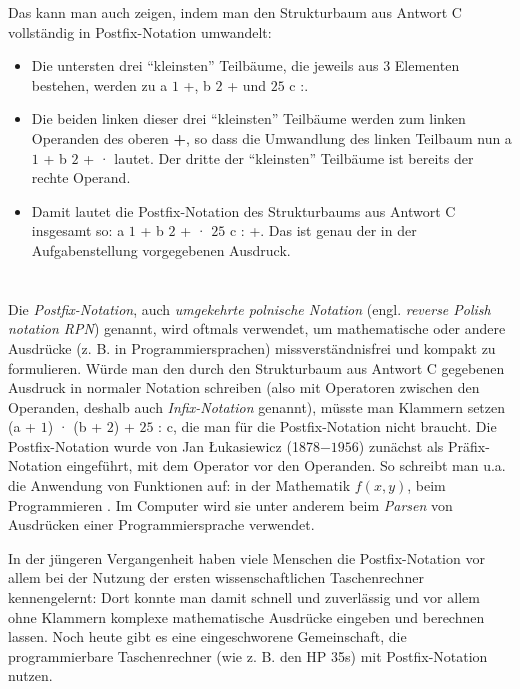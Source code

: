 {{Das kann man auch zeigen, indem man den Strukturbaum aus Antwort C vollständig in Postfix-Notation umwandelt:

\begin{itemize}
  \item Die untersten drei \enquote{kleinsten} Teilbäume, die jeweils aus $3$ Elementen bestehen, werden zu a $1$ +, b $2$ + und $25$ c :.
  \item Die beiden linken dieser drei \enquote{kleinsten} Teilbäume werden zum linken Operanden des oberen \textbf{+}, so dass die Umwandlung des linken Teilbaum nun a $1$ + b $2$ + · lautet. Der dritte der \enquote{kleinsten} Teilbäume ist bereits der rechte Operand.
  \item Damit lautet die Postfix-Notation des Strukturbaums aus Antwort C insgesamt so:  a $1$ + b $2$ + · $25$ c : +.  Das ist genau der in der Aufgabenstellung vorgegebenen Ausdruck.
\end{itemize}



\section*{\BrochureItsInformatics}
Die \emph{Postfix-Notation}, auch \emph{umgekehrte polnische Notation} (engl. \emph{reverse Polish notation RPN}) genannt, wird oftmals verwendet, um mathematische oder andere Ausdrücke (z. B. in Programmiersprachen) missverständnisfrei und kompakt zu formulieren. Würde man den durch den Strukturbaum aus Antwort C gegebenen Ausdruck in normaler Notation schreiben (also mit Operatoren zwischen den Operanden, deshalb auch \emph{Infix-Notation} genannt), müsste man Klammern setzen (a + $1$) · (b + $2$) + $25$ : c, die man für die Postfix-Notation nicht braucht. Die Postfix-Notation wurde von Jan Łukasiewicz (1878$-1956$) zunächst als Präfix-Notation eingeführt, mit dem Operator vor den Operanden.  So schreibt man u.a. die Anwendung von Funktionen auf: in der Mathematik ${f(x, y)}$, beim Programmieren .  Im Computer wird sie unter anderem beim \emph{Parsen} von Ausdrücken einer Programmiersprache verwendet.

In der jüngeren Vergangenheit haben viele Menschen die Postfix-Notation vor allem bei der Nutzung der ersten wissenschaftlichen Taschenrechner kennengelernt:  Dort konnte man damit schnell und zuverlässig und vor allem ohne Klammern komplexe mathematische Ausdrücke eingeben und berechnen lassen.  Noch heute gibt es eine eingeschworene Gemeinschaft, die programmierbare Taschenrechner (wie z. B. den HP 35s) mit Postfix-Notation nutzen.



}}
